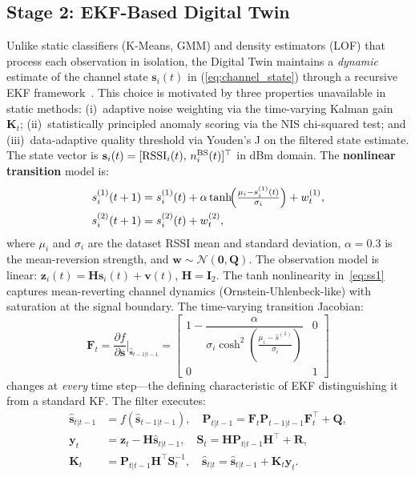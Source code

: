 \documentclass[conference]{IEEEtran}
\begin{document}
\subsection{Stage 2: EKF-Based Digital Twin}
\label{sec:dt}

Unlike static classifiers (K-Means, GMM) and density estimators (LOF)
that process each observation in isolation, the Digital Twin maintains
a \textit{dynamic} estimate of the channel state $\mathbf{s}_i(t)$ in
(\ref{eq:channel_state}) through a recursive EKF framework~\cite{ref_ekf}.
This choice is motivated by three properties unavailable in static methods:
(i)~adaptive noise weighting via the time-varying Kalman gain $\mathbf{K}_t$;
(ii)~statistically principled anomaly scoring via the NIS chi-squared test;
and (iii)~data-adaptive quality threshold via Youden's J on the filtered
state estimate. The state vector is
$\mathbf{s}_i(t)=[\text{RSSI}_i(t),\,n^{\rm BS}_i(t)]^\top$ in dBm domain.
The \textbf{nonlinear transition} model is:
\begin{align}
s^{(1)}_i(t+1) &= s^{(1)}_i(t)
  + \alpha\tanh\!\Bigl(\tfrac{\mu_i - s^{(1)}_i(t)}{\sigma_i}\Bigr)
  + w^{(1)}_t, \label{eq:ss1}\\
s^{(2)}_i(t+1) &= s^{(2)}_i(t) + w^{(2)}_t, \label{eq:ss2}
\end{align}
where $\mu_i$ and $\sigma_i$ are the dataset RSSI mean and standard
deviation, $\alpha{=}0.3$ is the mean-reversion strength,
and $\mathbf{w}\sim\mathcal{N}(\mathbf{0},\mathbf{Q})$.
The observation model is linear:
$\mathbf{z}_i(t)=\mathbf{H}\mathbf{s}_i(t)+\mathbf{v}(t)$,
$\mathbf{H}=\mathbf{I}_2$. The tanh nonlinearity in~\eqref{eq:ss1}
captures mean-reverting channel dynamics (Ornstein-Uhlenbeck-like) with
saturation at the signal boundary. The time-varying transition Jacobian:
\begin{equation}
\mathbf{F}_t = \frac{\partial f}{\partial \mathbf{s}}\bigg|_{\hat{\mathbf{s}}_{t-1|t-1}}
= \begin{bmatrix}1 - \dfrac{\alpha}{\sigma_i\cosh^2\!\left(\frac{\mu_i - \hat{s}^{(1)}}{\sigma_i}\right)} & 0\\[6pt] 0 & 1\end{bmatrix}
\label{eq:F_jacobian}
\end{equation}
changes at \emph{every} time step---the defining characteristic of EKF
distinguishing it from a standard KF. The filter executes:
\begin{align}
\hat{\mathbf{s}}_{t|t-1} &= f(\hat{\mathbf{s}}_{t-1|t-1}),\quad
\mathbf{P}_{t|t-1}=\mathbf{F}_t\mathbf{P}_{t-1|t-1}\mathbf{F}_t^\top+\mathbf{Q},
\label{eq:pred}\\
\mathbf{y}_t &= \mathbf{z}_t-\mathbf{H}\hat{\mathbf{s}}_{t|t-1},\quad
\mathbf{S}_t=\mathbf{H}\mathbf{P}_{t|t-1}\mathbf{H}^\top+\mathbf{R},
\label{eq:innov}\\
\mathbf{K}_t &= \mathbf{P}_{t|t-1}\mathbf{H}^\top\mathbf{S}_t^{-1},\quad
\hat{\mathbf{s}}_{t|t}=\hat{\mathbf{s}}_{t|t-1}+\mathbf{K}_t\mathbf{y}_t.
\label{eq:update}
\end{align}
\end{document}
